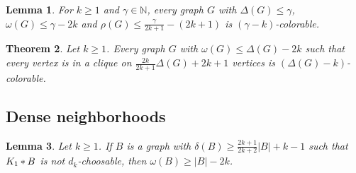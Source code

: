 \documentclass[12pt]{article}
\theoremstyle{plain}
\newtheorem{thm}{Theorem}[section]
\newtheorem{lem}[thm]{Lemma}
\theoremstyle{definition}
\theoremstyle{remark}
\newcommand{\IN}{\mathbb{N}}
\newcommand{\card}[1]{\left|#1\right|}
\newcommand{\join}[2]{#1 \mbox{\hspace{2 pt}$\ast$\hspace{2 pt}} #2}
\begin{document}
\begin{lem}\label{MainCorollary}
For $k \geq 1$ and $\gamma \in \IN$, every graph $G$ with $\Delta(G) \leq \gamma$, $\omega(G) \leq \gamma - 2k$ and $\rho(G) \leq \frac{\gamma}{2k+1} - (2k+1)$ is $(\gamma-k)$-colorable.
\end{lem}

\begin{thm}\label{MainSimpleCorollary}
Let $k \geq 1$. Every graph $G$ with $\omega(G) \leq \Delta(G) - 2k$ such that every vertex is in a clique on $\frac{2k}{2k+1}\Delta(G) + 2k + 1$ vertices is $(\Delta(G)-k)$-colorable.
\end{thm}

\subsection{Dense neighborhoods}
\begin{lem}\label{HighMinDegreeGivesClique}
Let $k \geq 1$. If $B$ is a graph with $\delta(B) \geq \frac{2k+1}{2k+2}\card{B} + k - 1$ such that $\join{K_1}{B}$ is not $d_k$-choosable, then $\omega(B) \geq \card{B} - 2k$.
\end{lem}
\end{document}
